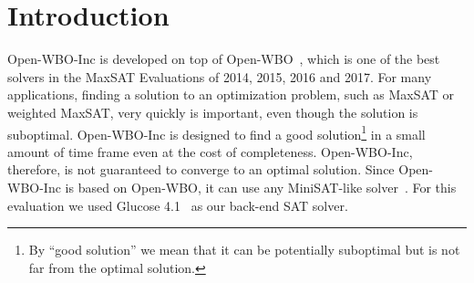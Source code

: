 \documentclass[conference]{IEEEtran}
\newcommand{\sjcomment}[1]{\textcolor{sjcolor}{SJ:#1}}
\newcommand{\toolname}{\textsf{Open-WBO-Inc}\xspace}
\begin{document}




\maketitle






%
\IEEEpeerreviewmaketitle



\section{Introduction}

\toolname is developed on top of Open-WBO~\cite{martins-sat14,martins-cp14,neves-sat15},
which is one of the best solvers in the MaxSAT Evaluations
of 2014, 2015, 2016 and 2017.
For many applications, finding a  solution to an
optimization problem, such as MaxSAT or weighted MaxSAT, very quickly
is important, even though the solution is suboptimal. \toolname is designed
to find a good solution\footnote{By ``good solution'' we mean that it can be potentially
suboptimal but is not far from the optimal solution.} in a small amount of time frame even
at the cost of completeness. \toolname, therefore, is not guaranteed to converge to an
optimal solution.
Since \toolname is based on Open-WBO, it  can use any MiniSAT-like
solver~\cite{minisat-sat03}. For this evaluation we used Glucose 4.1~\cite{audemard-ijcai09} as our back-end SAT solver.  


\end{document}
